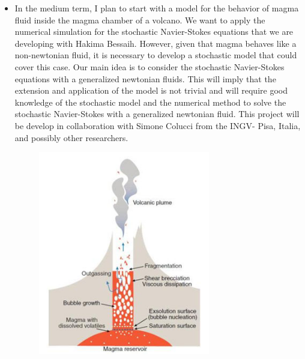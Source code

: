 \documentclass{article}
\numberwithin{equation}{section}
\begin{document}
\begin{itemize}


\item In the medium term, I plan to start with a model for the behavior of magma fluid inside the magma chamber of a volcano. We want to apply the numerical simulation for the stochastic Navier-Stokes equations that we are developing with Hakima Bessaih. However, given that  magma behaves like a non-newtonian fluid, it is necessary to develop a stochastic model that could cover this case. Our main idea is to consider the stochastic Navier-Stokes equations with a generalized newtonian fluids. This will imply that the extension and application of the model is not trivial and will require good knowledge of the stochastic model and the numerical  method to solve the stochastic Navier-Stokes with a generalized newtonian fluid. This project will be develop in 
collaboration with Simone Colucci from the INGV- Pisa, Italia, and possibly other researchers.

 \begin{figure}[H]
 \begin{center}
 
 \includegraphics[width = 2.95in]{carrico2.jpg} 
 \label{graph-simu_nu4.1}

 \end{center}
\end{figure}



\end{itemize}
\end{document}
